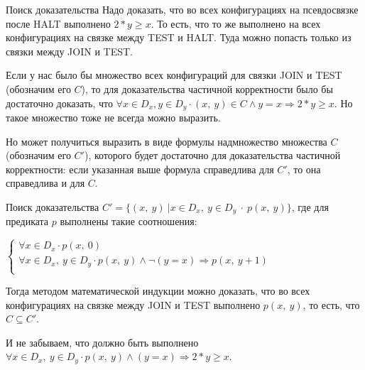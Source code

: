 \documentclass[hyperref={unicode=true}]{beamer}
\begin{document}
    \begin{frame}{Поиск доказательства}
    Надо доказать, что во всех конфигурациях на псевдосвязке после HALT выполнено $2*y \geq x$. То есть, что то же выполнено на всех конфигурациях на связке между TEST и HALT. Туда можно попасть только из связки между JOIN и TEST.

    Если у нас было бы множество всех конфигураций для связки JOIN и TEST (обозначим его $C$), то для доказательства частичной корректности было бы достаточно доказать, что $\forall x \in D_x, y \in D_y \cdot (x,~y) \in C \land y = x \Rightarrow 2 * y \geq x$. Но такое множество тоже не всегда можно выразить.

    Но может получиться выразить в виде формулы надмножество множества $C$ (обозначим его $C'$), которого будет достаточно для доказательства частичной корректности: если указанная выше формула справедлива для $C'$, то она справедлива и для $C$.
    \end{frame}

    \begin{frame}{Поиск доказательства}
    $C' = \{(x,~y)~|x \in D_x,~y \in D_y~\cdot~p(x,~y)\}$, где для предиката $p$ выполнены такие соотношения:

    $\begin{cases}
    \forall x \in D_x \cdot p(x,~0)\\
    \forall x \in D_x,~y \in D_y \cdot p(x,~y) \land \neg (y = x) \Rightarrow p(x,~y + 1)\\
    \end{cases}$

    Тогда методом математической индукции можно доказать, что во всех конфигурациях на связке между JOIN и TEST выполнено $p(x,~y)$, то есть, что $C \subseteq C'$.

    И не забываем, что должно быть выполнено $\forall x \in D_x,~y \in D_y \cdot p(x,~y) \land (y = x) \Rightarrow 2 * y \geq x$.
    \end{frame}
\end{document}
